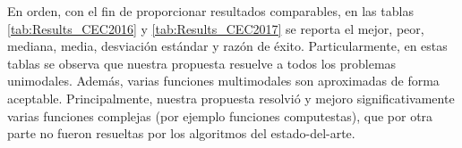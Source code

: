 En orden, con el fin de proporcionar resultados comparables, en las tablas \ref{tab:Results_CEC2016} y \ref{tab:Results_CEC2017} se reporta el mejor, peor, mediana, media, desviación estándar y razón de éxito.
%
Particularmente, en estas tablas se observa que nuestra propuesta resuelve a todos los problemas unimodales.
%
Además, varias funciones multimodales son aproximadas de forma aceptable.
%
Principalmente, nuestra propuesta resolvió y mejoro significativamente varias funciones complejas (por ejemplo funciones computestas), que por otra parte no fueron resueltas por los algoritmos del estado-del-arte.
%

